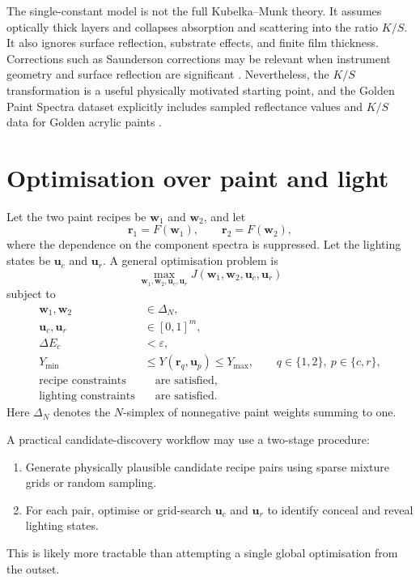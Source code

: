 \documentclass[11pt,a4paper]{article}
\newcommand{\vect}[1]{\boldsymbol{#1}}
\newcommand{\DE}{\Delta E}
\begin{document}
The single-constant model is not the full Kubelka--Munk theory. It assumes optically thick layers and collapses absorption and scattering into the ratio $K/S$. It also ignores surface reflection, substrate effects, and finite film thickness. Corrections such as Saunderson corrections may be relevant when instrument geometry and surface reflection are significant \citep{Saunderson1942}. Nevertheless, the $K/S$ transformation is a useful physically motivated starting point, and the Golden Paint Spectra dataset explicitly includes sampled reflectance values and $K/S$ data for Golden acrylic paints \citep{GoldenSpectra,YaleGoldenSpectra}.

\section{Optimisation over paint and light}

Let the two paint recipes be $\vect{w}_1$ and $\vect{w}_2$, and let
\begin{equation}
 \vect{r}_1=F(\vect{w}_1),\qquad \vect{r}_2=F(\vect{w}_2),
\end{equation}
where the dependence on the component spectra is suppressed. Let the lighting states be $\vect{u}_c$ and $\vect{u}_r$. A general optimisation problem is
\begin{equation}
 \max_{\vect{w}_1,\vect{w}_2,\vect{u}_c,\vect{u}_r} J(\vect{w}_1,\vect{w}_2,\vect{u}_c,\vect{u}_r)
 \label{eq:general_optimisation}
\end{equation}
subject to
\begin{align}
 \vect{w}_1,\vect{w}_2 &\in \Delta_N,\\
 \vect{u}_c,\vect{u}_r &\in [0,1]^m,\\
 \DE_c &< \varepsilon,\\
 Y_{\min} &\le Y(\vect{r}_q,\vect{u}_p)\le Y_{\max},\qquad q\in\{1,2\},\ p\in\{c,r\},\\
 \text{recipe constraints} &\quad \text{are satisfied},\\
 \text{lighting constraints} &\quad \text{are satisfied}.
\end{align}
Here $\Delta_N$ denotes the $N$-simplex of nonnegative paint weights summing to one.

A practical candidate-discovery workflow may use a two-stage procedure:
\begin{enumerate}
  \item Generate physically plausible candidate recipe pairs using sparse mixture grids or random sampling.
  \item For each pair, optimise or grid-search $\vect{u}_c$ and $\vect{u}_r$ to identify conceal and reveal lighting states.
\end{enumerate}
This is likely more tractable than attempting a single global optimisation from the outset.
\end{document}
